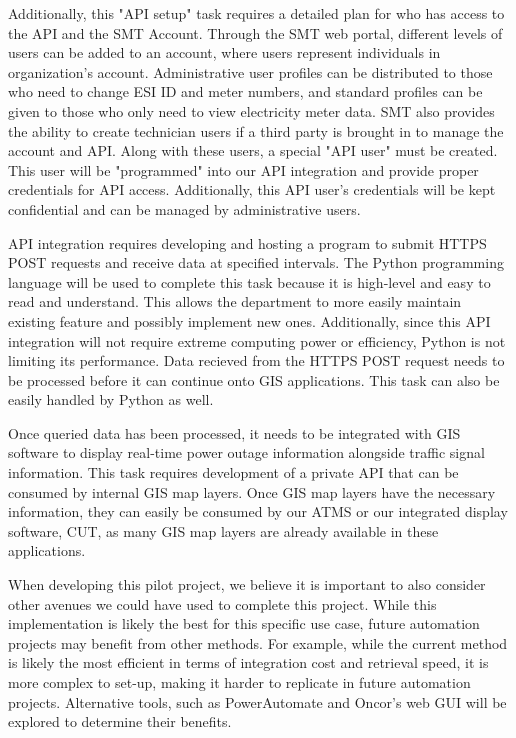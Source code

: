 \documentclass[letterpaper, notitlepage]{report}
\begin{document}
Additionally, this "API setup" task requires a detailed plan for who has access to the API and the SMT Account. Through the SMT web portal, different levels of users can be added to an account, where users represent individuals in organization's account. Administrative user profiles can be distributed to those who need to change ESI ID and meter numbers, and standard profiles can be given to those who only need to view electricity meter data. SMT also provides the ability to create technician users if a third party is brought in to manage the account and API. Along with these users, a special "API user" must be created. This user will be "programmed" into our API integration and provide proper credentials for API access. Additionally, this API user's credentials will be kept confidential and can be managed by administrative users.

API integration requires developing and hosting a program to submit HTTPS POST requests and receive data at specified intervals. The Python programming language will be used to complete this task because it is high-level and easy to read and understand. This allows the department to more easily maintain existing feature and possibly implement new ones. Additionally, since this API integration will not require extreme computing power or efficiency, Python is not limiting its performance. Data recieved from the HTTPS POST request needs to be processed before it can continue onto GIS applications. This task can also be easily handled by Python as well.

Once queried data has been processed, it needs to be integrated with GIS software to display real-time power outage information alongside traffic signal information. This task requires development of a private API that can be consumed by internal GIS map layers. Once GIS map layers have the necessary information, they can easily be consumed by our ATMS or our integrated display software, CUT, as many GIS map layers are already available in these applications.

When developing this pilot project, we believe it is important to also consider other avenues we could have used to complete this project. While this implementation is likely the best for this specific use case, future automation projects may benefit from other methods. For example, while the current method is likely the most efficient in terms of integration cost and retrieval speed, it is more complex to set-up, making it harder to replicate in future automation projects. Alternative tools, such as PowerAutomate and Oncor's web GUI will be explored to determine their benefits.
\end{document}
